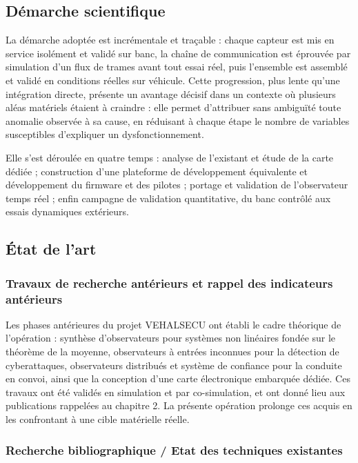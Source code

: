 \documentclass[11pt,a4paper]{article}
\begin{document}
\subsection{Démarche scientifique}

La démarche adoptée est incrémentale et traçable : chaque capteur est mis en service isolément et validé sur banc, la chaîne de communication est éprouvée par simulation d’un flux de trames avant tout essai réel, puis l’ensemble est assemblé et validé en conditions réelles sur véhicule. Cette progression, plus lente qu’une intégration directe, présente un avantage décisif dans un contexte où plusieurs aléas matériels étaient à craindre : elle permet d’attribuer sans ambiguïté toute anomalie observée à sa cause, en réduisant à chaque étape le nombre de variables susceptibles d’expliquer un dysfonctionnement.

Elle s’est déroulée en quatre temps : analyse de l’existant et étude de la carte dédiée ; construction d’une plateforme de développement équivalente et développement du firmware et des pilotes ; portage et validation de l’observateur temps réel ; enfin campagne de validation quantitative, du banc contrôlé aux essais dynamiques extérieurs.

\subsection{État de l’art}

\subsubsection{Travaux de recherche antérieurs et rappel des indicateurs antérieurs}

Les phases antérieures du projet VEHALSECU ont établi le cadre théorique de l’opération : synthèse d’observateurs pour systèmes non linéaires fondée sur le théorème de la moyenne, observateurs à entrées inconnues pour la détection de cyberattaques, observateurs distribués et système de confiance pour la conduite en convoi, ainsi que la conception d’une carte électronique embarquée dédiée. Ces travaux ont été validés en simulation et par co-simulation, et ont donné lieu aux publications rappelées au chapitre 2. La présente opération prolonge ces acquis en les confrontant à une cible matérielle réelle.

\subsubsection{Recherche bibliographique / Etat des techniques existantes}
\end{document}
